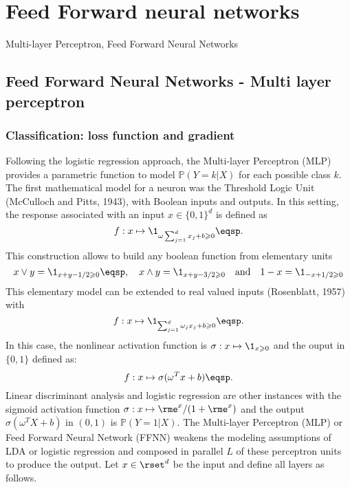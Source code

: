 \chapter{Feed Forward neural networks}
\minitoc
\begin{kwd}
Multi-layer Perceptron, Feed Forward Neural Networks
\end{kwd}



\section{Feed Forward Neural Networks - Multi layer perceptron} 
\subsection{Classification: loss function and gradient}
Following the logistic regression approach, the Multi-layer Perceptron (MLP) provides a parametric function to model $\mathbb{P}(Y=k | X)$ for each possible class $k$.
The first  mathematical model for a neuron was the Threshold Logic Unit (McCulloch and Pitts, 1943), with Boolean inputs and outputs. In this setting, the response associated with an input $x\in\{0,1\}^d$ is defined as 
$$
f: x\mapsto \1_{\omega\sum_{j=1}^dx_j + b \geqslant 0}\eqsp.
$$ 
This construction allows to build any boolean function from elementary units
\[
x\vee y = \1_{x+y-1/2 \geqslant 0}\eqsp,\quad x\wedge y = \1_{x+y-3/2 \geqslant 0}\quad\mathrm{and}\quad  1-x = \1_{-x+1/2 \geqslant 0}
\] 
This elementary model can be extended to real valued inputs (Rosenblatt, 1957) with 
$$
f: x\mapsto \1_{\sum_{j=1}^d\omega_jx_j + b \geqslant 0}\eqsp.
$$
In this case, the nonlinear activation function is $\sigma: x \mapsto \1_{x\geqslant 0}$ and the ouput in $\{0,1\}$ defined as:
\[
f:x \mapsto \sigma(\omega^Tx + b)\eqsp.
\]
Linear discriminant analysis and logistic regression are other instances with the sigmoid activation function $\sigma: x\mapsto \rme^x/(1+\rme^x)$ and the output $ \sigma(\omega^TX + b)$ in $(0,1)$ is $\mathbb{P}(Y=1 | X)$.
The Multi-layer Perceptron (MLP) or Feed Forward Neural Network (FFNN) weakens the modeling assumptions of LDA or logistic regression and composed in parallel  $L$ of these perceptron units to produce the output. Let $x\in\rset^d$ be the input and define all layers as follows.
